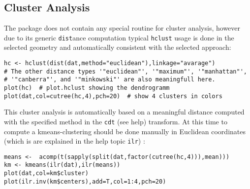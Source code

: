 \documentclass{article}
\newcommand{\code}[1]{{\tt #1}}
\begin{document}
\subsection{Cluster Analysis}
The package does not contain any special routine for cluster analysis,
however due to its generic \code{dist}ance computation typical \code{hclust}
usage is done in the selected geometry and automatically consistent with the
selected approach: 
\begin{verbatim}
hc <- hclust(dist(dat,method="euclidean"),linkage="avarage")
# The other distance types '"euclidean"', '"maximum"', '"manhattan"', 
# '"canberra"', and '"minkowski"' are also meaningfull here.
plot(hc)  # plot.hclust showing the dendrogramm
plot(dat,col=cutree(hc,4),pch=20)  # show 4 clusters in colors
\end{verbatim}
This cluster analysis is automatically based on a meaningful distance
computed with the specified method in the \code{cdt} (see help) transform.  At
this time to compute a kmeans-clustering should be done manually in Euclidean
coordinates (which is are explained in the help topic \code{ilr}) :
\begin{verbatim}
means <-  acomp(t(sapply(split(dat,factor(cutree(hc,4))),mean)))
km <- kmeans(ilr(dat),ilr(means))
plot(dat,col=km$cluster)
plot(ilr.inv(km$centers),add=T,col=1:4,pch=20)
\end{verbatim}
\end{document}
